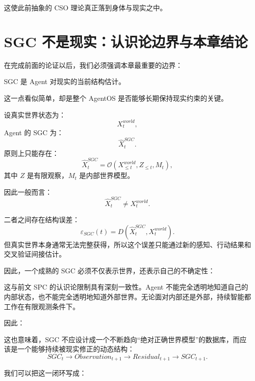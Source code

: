 这使此前抽象的 CSO 理论真正落到身体与现实之中。

\section{SGC 不是现实：认识论边界与本章结论}

在完成前面的论证以后，我们必须强调本章最重要的边界：

\begin{statementbox}
\centering
{}
\end{statementbox}

SGC 是 Agent 对现实的当前结构估计。

这一点看似简单，却是整个 AgentOS 是否能够长期保持现实约束的关键。

设真实世界状态为：
\[
X_t^{world},
\]
Agent 的 SGC 为：
\[
\hat X_t^{SGC}.
\]
原则上只能存在：
\[
\hat X_t^{SGC}
=
\mathcal O
\left(
X_{\leq t}^{world},
Z_{\leq t},
M_t
\right),
\]
其中 \(Z\) 是有限观察，\(M_t\) 是内部世界模型。

因此一般而言：
\[
\hat X_t^{SGC}
\neq
X_t^{world}.
\]

二者之间存在结构误差：
\[
\varepsilon_{SGC}(t)
=
D
\left(
\hat X_t^{SGC},
X_t^{world}
\right).
\]
但真实世界本身通常无法完整获得，所以这个误差只能通过新的感知、行动结果和交叉验证间接估计。

因此，一个成熟的 SGC 必须不仅表示世界，还表示自己的不确定性：
\begin{statementbox}
\centering
{}
\end{statementbox}

这与前文 SPC 的认识论限制具有深刻一致性。Agent 不能完全透明地知道自己的内部状态，也不能完全透明地知道外部世界。无论面对内部还是外部，持续智能都工作在有限观测条件下。

因此：
\begin{statementbox}
\centering
{}
\end{statementbox}

这也意味着，SGC 不应设计成一个不断趋向“绝对正确世界模型”的数据库，而应该是一个能够持续被现实修正的动态结构：
\[
SGC_t
\rightarrow
Observation_{t+1}
\rightarrow
Residual_{t+1}
\rightarrow
SGC_{t+1}.
\]

我们可以把这一闭环写成：
\begin{statementbox}
\centering
{}
\end{statementbox}

